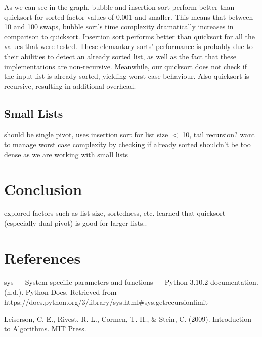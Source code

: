 \documentclass[12pt]{article}
\begin{document}
\noindent As we can see in the graph, bubble and insertion sort perform better than quicksort for sorted-factor values of 0.001 and smaller. This means that between 10 and 100 swaps, bubble sort's time complexity dramatically increases in comparison to quicksort. Insertion sort performs better than quicksort for all the values that were tested. These elemantary sorts' performance is probably due to their abilities to detect an already sorted list, as well as the fact that these implementations are non-recursive. Meanwhile, our quicksort does not check if the input list is already sorted, yielding worst-case behaviour. Also quicksort is recursive, resulting in additional overhead.



\subsection{Small Lists}

should be single pivot, uses insertion sort for list size $<$ 10, tail recursion?
want to manage worst case complexity by checking if already sorted
shouldn't be too dense as we are working with small lists

\section{Conclusion}

explored factors such as list size, sortedness, etc.
learned that quicksort (especially dual pivot) is good for larger lists..

\newpage\section*{References}
\begin{enumerate}[label={[\arabic*]}]
\item	sys — System-specific parameters and functions — Python 3.10.2 documentation. (n.d.). Python Docs. Retrieved from https://docs.python.org/3/library/sys.html\#sys.getrecursionlimit
\item	Leiserson, C. E., Rivest, R. L., Cormen, T. H., \& Stein, C. (2009). Introduction to Algorithms. MIT Press.

\end{enumerate}
\end{document}
